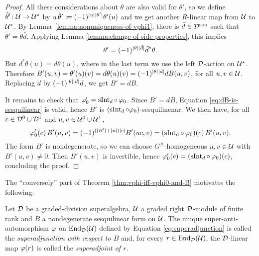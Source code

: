 \begin{proof}
    All these considerations about $\theta$ are also valid for $\theta'$, so we define $\tilde\theta'\colon \mathcal U \to \mathcal U^\star$ by $u\,\tilde\theta' \coloneqq (-1)^{|u||\theta'|} \theta'(u)$ and we get another $R$-linear map from $\mathcal U$ to $\mathcal U^\star$.
    By Lemma~\ref{lemma:nonuniqueness-of-vphi1}, there is $\bar d\in \mathcal{D}^{\mathrm{sop}}$ such that $\tilde\theta' = \tilde\theta \bar d$.
    Applying Lemma \ref{lemma:change-of-side-properties}, this implies \[\theta' = (-1)^{|\theta||\bar d|} \bar d^\circ \theta.\]
    But $\bar d^\circ \theta (u) = d\theta(u)$, where in the last term we use the left $\mathcal{D}$-action on $\mathcal U^\star$. 
    Therefore $B'(u,v) = \theta'(u)(v) = d\theta(u)(v) = (-1)^{|\theta||d|} dB(u, v)$, for all $u,v \in \mathcal U$. 
    Replacing $d$ by $(-1)^{|\theta||d|} d$, we get $B' = dB$. 
    
    It remains to check that $\varphi_0' = \operatorname{sInt}_d \circ\, \varphi_0$. 
    Since $B' = dB$, Equation \eqref{eq:dB-is-sesquilinear} is valid, hence $B'$ is $(\operatorname{sInt}_d \circ \varphi_0)$-sesquilinenar.
    We then have, for all $c\in \mathcal{D}^{\bar0} \cup \mathcal{D}^{\bar1}$ and $u,v \in \mathcal U^{\bar0} \cup \mathcal U^{\bar1}$,
    \[
        \varphi_0'(c)\, B'(u,v) = (-1)^{(|B'| + |u|) |c|} B'(uc,v) = (\operatorname{sInt_d} \circ\, \varphi_0) (c)\, B'(u,v).
    \]
    The form $B'$ is nondegenerate, so we can choose $G^\#$-homogeneous $u,v\in \mathcal U$ with $B'(u,v)\neq 0$. Then $B'(u,v)$ is invertible, hence $\varphi_0' (c) = (\operatorname{sInt}_d \circ\, \varphi_0) (c)$, concluding the proof.
\end{proof}

The ``conversely'' part of Theorem \ref{thm:vphi-iff-vphi0-and-B} motivates the following:

\begin{defi}\label{def:superadjunction}
    Let $\mathcal{D}$ be a graded-division superalgebra, $\mathcal U$ a graded right $\mathcal{D}$-module of finite rank and $B$ a nondegenerate sesquilinear form on $\mathcal U$. 
    The unique super-anti-automorphism $\varphi$ on $\operatorname{End}_{\mathcal{D}}(\mathcal U)$ defined by Equation \eqref{eq:superadjunction} is called the \emph{superadjunction with respect to $B$} and, for every $r\in \operatorname{End}_{\mathcal{D}}(\mathcal U)$, the $\mathcal{D}$-linear map $\varphi(r)$ is called the \emph{superadjoint of $r$}.
\end{defi}

